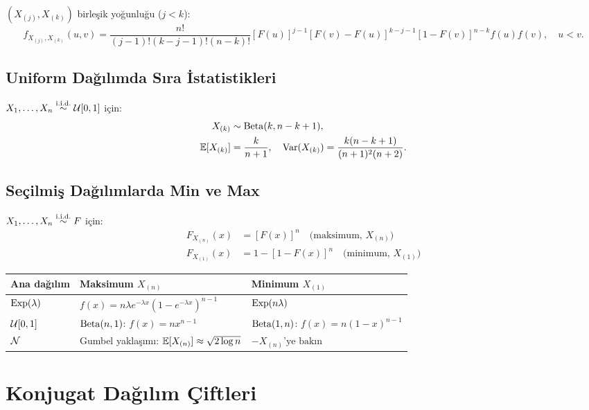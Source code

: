 \begin{teorem}
$(X_{(j)}, X_{(k)})$ birleşik yoğunluğu ($j<k$):
\[
  f_{X_{(j)},X_{(k)}}(u,v) = \frac{n!}{(j-1)!(k-j-1)!(n-k)!}[F(u)]^{j-1}[F(v)-F(u)]^{k-j-1}[1-F(v)]^{n-k}f(u)f(v), \quad u<v.
\]
\end{teorem}

\subsection{Uniform Dağılımda Sıra İstatistikleri}

$X_1,\ldots,X_n\overset{\text{i.i.d.}}{\sim}\mathcal{U}[0,1]$ için:
\begin{align*}
  X_{(k)} &\sim \operatorname{Beta}(k, n-k+1), \\
  \mathbb{E}[X_{(k)}] &= \frac{k}{n+1}, \quad \operatorname{Var}(X_{(k)}) = \frac{k(n-k+1)}{(n+1)^2(n+2)}.
\end{align*}

\subsection{Seçilmiş Dağılımlarda Min ve Max}

$X_1,\ldots,X_n\overset{\text{i.i.d.}}{\sim} F$ için:
\begin{align*}
  F_{X_{(n)}}(x) &= [F(x)]^n \quad\text{(maksimum, }X_{(n)}\text{)} \\
  F_{X_{(1)}}(x) &= 1-[1-F(x)]^n \quad\text{(minimum, }X_{(1)}\text{)}
\end{align*}

\begin{center}
\renewcommand{\arraystretch}{1.5}
\small
\begin{tabular}{p{2.5cm}p{5cm}p{4cm}}
\hline
\textbf{Ana dağılım} & \textbf{Maksimum} $X_{(n)}$ & \textbf{Minimum} $X_{(1)}$\\
\hline
$\operatorname{Exp}(\lambda)$ & $f(x)=n\lambda e^{-\lambda x}(1-e^{-\lambda x})^{n-1}$ & $\operatorname{Exp}(n\lambda)$ \\
$\mathcal{U}[0,1]$ & $\operatorname{Beta}(n,1)$: $f(x)=nx^{n-1}$ & $\operatorname{Beta}(1,n)$: $f(x)=n(1-x)^{n-1}$ \\
$\mathcal{N}$ & Gumbel yaklaşımı: $\mathbb{E}[X_{(n)}]\approx\sqrt{2\log n}$ & $-X_{(n)}\text{'ye bakın}$ \\
\hline
\end{tabular}
\end{center}

\section{Konjugat Dağılım Çiftleri}
\label{app:konjugat_dagilimlar}

